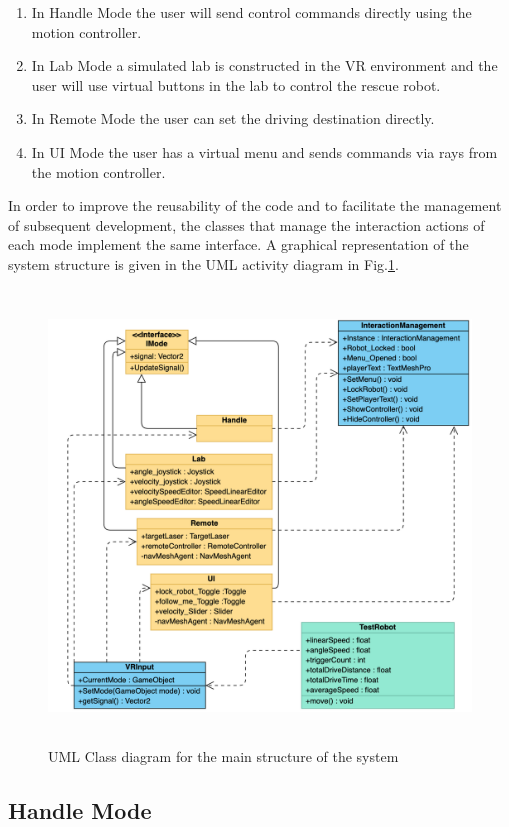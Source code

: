 \begin{enumerate}
\item In Handle Mode the user will send control commands directly using the motion controller. 
\item In Lab Mode a simulated lab is constructed in the VR environment and the user will use virtual buttons in the lab to control the rescue robot. 
\item In Remote Mode the user can set the driving destination directly. 
\item In UI Mode the user has a virtual menu and sends commands via rays from the motion controller.
\end{enumerate}

In order to improve the reusability of the code and to facilitate the management of subsequent development, the classes that manage the interaction actions of each mode implement the same interface. A graphical representation of the system structure is given in the UML activity diagram in Fig.\ref{fig:uml}.

\begin{figure}[h]
    \centering
    \includegraphics[height=12cm]{graphics/uml.png}
    \caption{UML Class diagram for the main structure of the system}
    \label{fig:uml}
\end{figure}

\subsection{Handle Mode}
